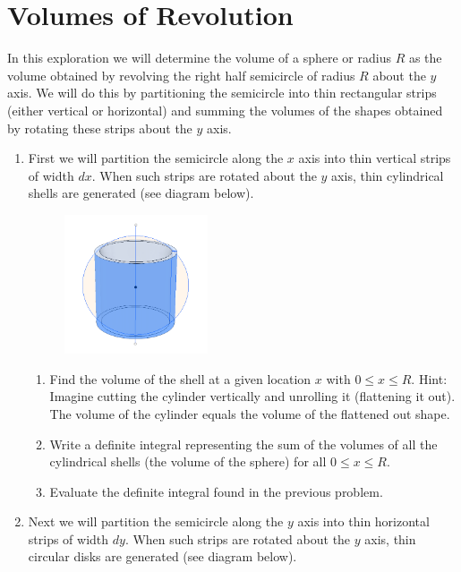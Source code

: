 \documentclass[12pt,letterpaper,fleqn]{article}
\begin{document}
\section*{Volumes of Revolution}
In this exploration we will determine the volume of a sphere or radius $R$ as the volume obtained by revolving the right half semicircle of radius $R$ about the $y$ axis. We will do this by partitioning the semicircle into thin rectangular strips (either vertical or horizontal) and summing the volumes of the shapes obtained by rotating these strips about the $y$ axis.
\begin{enumerate}
 \item First we will partition the semicircle along the $x$ axis into thin vertical strips of width $dx$. When such strips are rotated about the $y$ axis, thin cylindrical shells are generated (see diagram below).
       \begin{figure}[!htb]
        \includegraphics[width=0.4\textwidth]{img/spehre_vol_by_shells.png}
       \end{figure}
       \begin{enumerate}
        \item Find the volume of the shell at a given location $x$ with $0 \leq x \leq R$. Hint: Imagine cutting the cylinder vertically and unrolling it (flattening it out). The volume of the cylinder equals the volume of the flattened out shape.
        \item Write a definite integral representing the sum of the volumes of all the cylindrical shells (the volume of the sphere) for all $0 \leq x \leq R$.
        \item Evaluate the definite integral found in the previous problem.
       \end{enumerate}
       \newpage
 \item Next we will partition the semicircle along the $y$ axis into thin horizontal strips of width $dy$. When such strips are rotated about the $y$ axis, thin circular disks are generated (see diagram below).

\end{enumerate}
\end{document}
